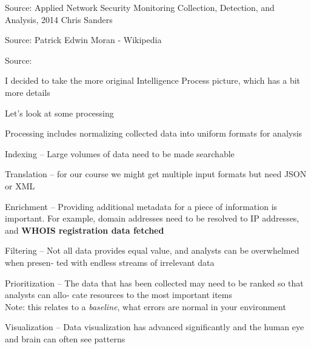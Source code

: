 \documentclass[Screen16to9,17pt]{foils}
\begin{document}
Source: Applied Network Security Monitoring Collection, Detection, and Analysis, 2014 Chris Sanders



Source: Patrick Edwin Moran - Wikipedia 




Source: 

\begin{list2}
\item I decided to take the more original Intelligence Process picture, which has a bit more details
\end{list2}


Let's look at some processing

\begin{list2}
\item Processing includes normalizing collected data into uniform formats for analysis
\item Indexing -- Large volumes of data need to be made searchable
\item Translation -- for our course we might get multiple input formats but need JSON or XML
\item Enrichment -- Providing additional metadata for a piece of information is important. For example, domain addresses need to be resolved to IP addresses, and {\bf WHOIS registration data fetched}
\item Filtering --
Not all data provides equal value, and analysts can be overwhelmed when presen‐
ted with endless streams of irrelevant data
\item Prioritization --
The data that has been collected may need to be ranked so that analysts can allo‐
cate resources to the most important items\\
Note: this relates to a \emph{baseline}, what errors are normal in your environment
\item Visualization -- Data visualization has advanced significantly and the human eye and brain can often see patterns
\end{list2}



\end{document}
